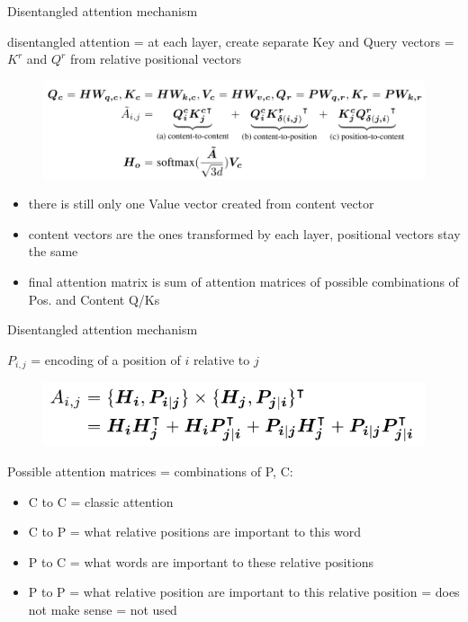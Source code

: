 \documentclass{beamer}
\begin{document}
\begin{frame}{Disentangled attention mechanism}


disentangled attention = at each layer, create separate Key and Query vectors = $K^r$ and $Q^r$ from relative positional vectors 
\begin{figure}[h]
\includegraphics[width=\textwidth]{img/att2}
\end{figure}

\begin{itemize}
\item there is still only one Value vector created from content vector
\item content vectors are the ones transformed by each layer, positional vectors stay the same
\item final attention matrix is sum of attention matrices of possible combinations of Pos. and Content Q/Ks
\end{itemize}

\end{frame}
\begin{frame}{Disentangled attention mechanism}

$P_{i,j}$ = encoding of a position of $i$ relative to $j$
\begin{figure}[h]
\includegraphics[width=\textwidth]{img/attij}
\end{figure}

Possible attention matrices = combinations of P, C:
\begin{itemize}
\item C to C = classic attention
\item C to P = what relative positions are important to this word
\item P to C = what words are important to these relative positions
\item P to P = what relative position are important to this relative position = does not make sense = not used
\end{itemize}

\end{frame}
\end{document}
